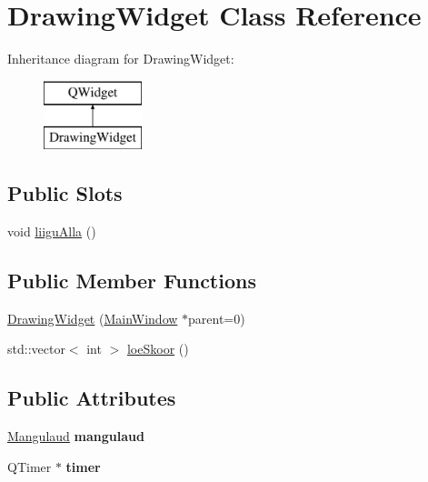 \hypertarget{class_drawing_widget}{}\section{Drawing\+Widget Class Reference}
\label{class_drawing_widget}
Inheritance diagram for Drawing\+Widget\+:\begin{figure}[H]
\begin{center}
\leavevmode
\includegraphics[height=2.000000cm]{class_drawing_widget}
\end{center}
\end{figure}
\subsection*{Public Slots}
\begin{DoxyCompactItemize}
\item 
void \mbox{\hyperlink{class_drawing_widget_a55410c521353a1b11424d7eb7e482482}{liigu\+Alla}} ()
\end{DoxyCompactItemize}
\subsection*{Public Member Functions}
\begin{DoxyCompactItemize}
\item 
\mbox{\hyperlink{class_drawing_widget_a023e273550ee1a82ddb40468c36460d9}{Drawing\+Widget}} (\mbox{\hyperlink{class_main_window}{Main\+Window}} $\ast$parent=0)
\item 
std\+::vector$<$ int $>$ \mbox{\hyperlink{class_drawing_widget_a77322953487457dd5295914ad7607ca1}{loe\+Skoor}} ()
\end{DoxyCompactItemize}
\subsection*{Public Attributes}
\begin{DoxyCompactItemize}
\item 
\mbox{\label{class_drawing_widget_a1bd588c98b1fb9fd07050a253cb5e403}} 
\mbox{\hyperlink{class_mangulaud}{Mangulaud}} {\bfseries mangulaud}
\item 
\mbox{\label{class_drawing_widget_aa8c2cb6fb4063eb28ea46addc7a38b6c}} 
Q\+Timer $\ast$ {\bfseries timer}
\end{DoxyCompactItemize}
